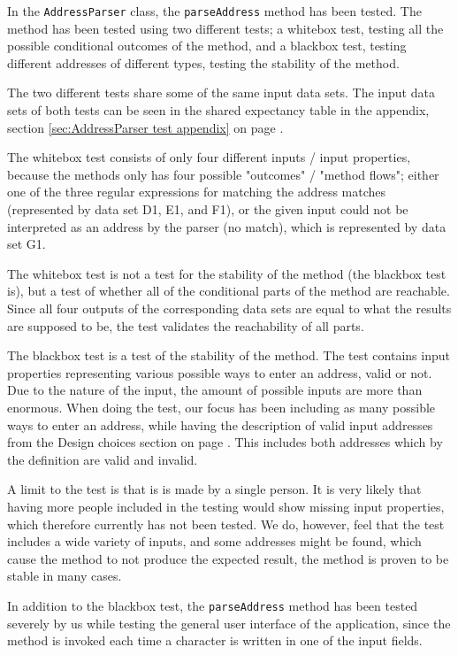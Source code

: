 In the \texttt{AddressParser} class, the \texttt{parseAddress} method has been tested. The method has been tested using two different tests; a whitebox test, testing all the possible conditional outcomes of the method, and a blackbox test, testing different addresses of different types, testing the stability of the method.

The two different tests share some of the same input data sets. The input data sets of both tests can be seen in the shared expectancy table in the appendix, section \ref{sec:AddressParser test appendix} on page \pageref{sec:AddressParser test appendix}.

The whitebox test consists of only four different inputs / input properties, because the methods only has four possible "outcomes" / "method flows"; either one of the three regular expressions for matching the address matches (represented by data set D1, E1, and F1), or the given input could not be interpreted as an address by the parser (no match), which is represented by data set G1.

The whitebox test is not a test for the stability of the method (the blackbox test is), but a test of whether all of the conditional parts of the method are reachable. Since all four outputs of the corresponding data sets are equal to what the results are supposed to be, the test validates the reachability of all parts.

The blackbox test is a test of the stability of the method. The test contains input properties representing various possible ways to enter an address, valid or not. Due to the nature of the input, the amount of possible inputs are more than enormous. When doing the test, our focus has been including as many possible ways to enter an address,   while having the description of valid input addresses from the Design choices section on page \pageref{sec: What is a valid address}. This includes both addresses which by the definition are valid and invalid.

A limit to the test is that is is made by a single person. It is very likely that having more people included in the testing would show missing input properties, which therefore currently has not been tested. We do, however, feel that the test includes a wide variety of inputs, and some addresses might be found, which cause the method to not produce the expected result, the method is proven to be stable in many cases.

In addition to the blackbox test, the \texttt{parseAddress} method has been tested severely by us while testing the general user interface of the application, since the method is invoked each time a character is written in one of the input fields.